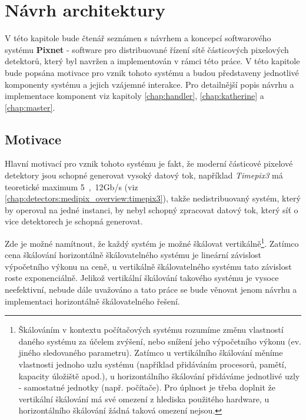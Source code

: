 

\chapter{Návrh architektury}\label{chap:arch}
V této kapitole bude čtenář seznámen s návrhem a koncepcí softwarového systému \textbf{Pixnet} - software pro distribuované řízení sítě částicových pixelových detektorů, který byl navržen a implementován v rámci této práce. V této kapitole bude popsána motivace pro vznik tohoto systému a budou představeny jednotlivé komponenty systému a jejich vzájemné interakce. Pro detailnější popis návrhu a implementace komponent viz kapitoly \ref{chap:handler}, \ref{chap:katherine} a \ref{chap:master}.

\section{Motivace}\label{chap:arch:motivation}
Hlavní motivací pro vznik tohoto systému je fakt, že moderní částicové pixelové detektory jsou schopné generovat vysoký datový tok, například \textit{Timepix3} má teoretické maximum \unit{5,12}{Gb/s} (viz \ref{chap:detectors:medipix_overview:timepix3}), takže nedistribuovaný systém, který by operoval na jedné instanci, by nebyl schopný zpracovat datový tok, který síť o vice detektorech je schopná generovat. 

Zde je možné namítnout, že každý systém je možné škálovat vertikálně\footnote{Škálováním v kontextu počítačových systému rozumíme změnu vlastností daného systému za účelem zvýšení, nebo snížení jeho výpočetního výkonu (ev. jiného sledovaného parametru). Zatímco u vertikálního škálování měníme vlastnosti jednoho uzlu systému (například přidáváním procesorů, pamětí, kapacity úložiště apod.), u horizontálního škálování přidáváme jednotlivé uzly - samostatné  jednotky (např. počítače). Pro úplnost je třeba doplnit že vertikální škálování má své omezení z hlediska použitého hardware, u horizontálního škálování žádná taková omezení nejsou.}. Zatímco cena škálování horizontálně škálovatelného systému je lineární závislost výpočetního výkonu na ceně, u vertikálně škálovatelného systému tato závislost roste exponenciálně. Jelikož vertikální škálování takového systému je  vysoce neefektivní, nebude dále uvažováno a tato práce se bude věnovat jenom návrhu a implementaci horizontálně škálovatelného řešení.

